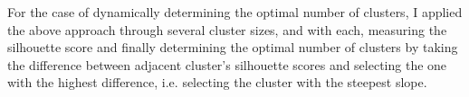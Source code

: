 \begin{flushleft}
        For the case of dynamically determining the optimal number of clusters, I applied the above approach through several cluster sizes, 
        and with each, measuring the silhouette score and finally determining the optimal number of clusters by taking the difference between 
        adjacent cluster's silhouette scores and selecting the one with the highest difference, i.e. selecting the cluster with the steepest slope.
\end{flushleft}